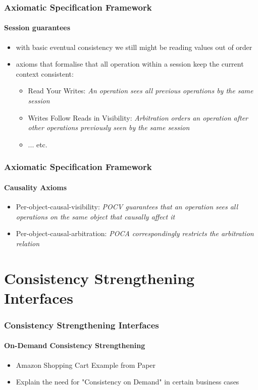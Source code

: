 \documentclass[11pt]{beamer}
\begin{document}
\begin{frame}
\frametitle{Axiomatic Specification Framework}
\framesubtitle{Session guarantees}
\begin{itemize}
\item with basic eventual consistency we still might be reading values out of order
\item axioms that formalise that all operation within a session keep the current context consistent:
\begin{itemize}
\item Read Your Writes: \textit{An operation sees all previous operations
by the same session}
\item Writes Follow Reads in Visibility: \textit{Arbitration orders an
operation after other operations previously seen by the same session}
\item ... etc.
\end{itemize}
\end{itemize}
\end{frame}

\begin{frame}
\frametitle{Axiomatic Specification Framework}
\framesubtitle{Causality Axioms}
\begin{itemize}
\item Per-object-causal-visibility:
\textit{POCV guarantees that an operation sees all operations
on the same object that causally affect it}
\item Per-object-causal-arbitration:
\textit{POCA correspondingly
restricts the arbitration relation}
\end{itemize}
\end{frame}

\section{Consistency Strengthening Interfaces}

\begin{frame}
\frametitle{Consistency Strengthening Interfaces}
\framesubtitle{On-Demand Consistency Strengthening}
\begin{itemize}
\item Amazon Shopping Cart Example from Paper
\item Explain the need for "Consistency on Demand" in certain business cases
\end{itemize}
\end{frame}
\end{document}
